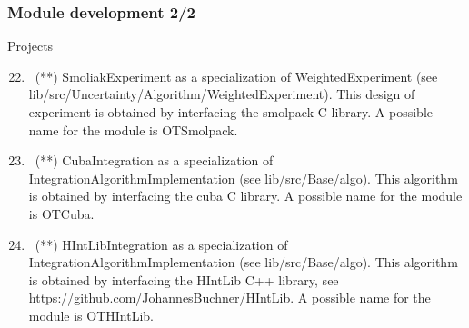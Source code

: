 \documentclass[8pt]{beamer}
\begin{document}
\begin{frame}
  \frametitle{Module development 2/2}
  \begin{block}{Projects}
    \begin{enumerate}
      \setcounter{enumi}{21}
    \item~(**) \alert{\ttfamily SmoliakExperiment} as a specialization of {\ttfamily WeightedExperiment} (see {\ttfamily lib/src/Uncertainty/Algorithm/WeightedExperiment}). This design of experiment is obtained by interfacing the smolpack C library. A possible name for the module is \alert{OTSmolpack}.
    \item~(**) \alert{\ttfamily CubaIntegration} as a specialization of {\ttfamily IntegrationAlgorithmImplementation} (see {\ttfamily lib/src/Base/algo}). This algorithm is obtained by interfacing the cuba C library. A possible name for the module is \alert{OTCuba}.
    \item~(**) \alert{\ttfamily HIntLibIntegration} as a specialization of {\ttfamily IntegrationAlgorithmImplementation} (see {\ttfamily lib/src/Base/algo}). This algorithm is obtained by interfacing the HIntLib C++ library, see \alert{https://github.com/JohannesBuchner/HIntLib}. A possible name for the module is \alert{OTHIntLib}.
    \end{enumerate}
  \end{block}
\end{frame}
\end{document}
